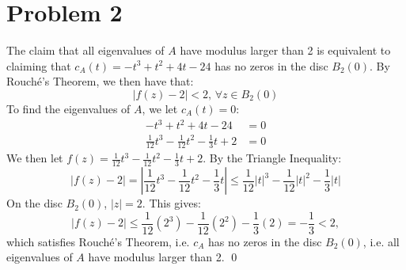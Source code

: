 \documentclass[a4paper, titlepage, DIV=14]{scrartcl}
\begin{document}
    \section*{Problem 2}
    The claim that all eigenvalues of $A$ have modulus larger than 2 is equivalent to claiming that
    $c_{A}(t) = -t^{3} + t^{2} + 4t -24$ has no zeros in the disc $B_{2}(0)$. By Rouch\'{e}'s Theorem, 
    we then have that:
    \begin{equation*}
        |f(z) - 2| < 2, \, \forall z \in B_{2}(0)
    \end{equation*}
    To find the eigenvalues of $A$, we let $c_{A}(t) = 0$:
    \begin{align*}
        -t^{3} + t^{2} + 4t - 24 &= 0 \\
        \frac{1}{12}t^{3} - \frac{1}{12}t^{2} - \frac{1}{3}t + 2 &= 0
    \end{align*}
    We then let $f(z)=\frac{1}{12}t^{3} - \frac{1}{12}t^{2} - \frac{1}{3}t + 2$. By the Triangle Inequality:
    \begin{equation*}
        |f(z)-2| = |\frac{1}{12}t^{3} - \frac{1}{12}t^{2} - \frac{1}{3}t| \leq \frac{1}{12}|t|^{3} - \frac{1}{12}|t|^{2} - \frac{1}{3}|t| 
    \end{equation*}
    On the disc $B_{2}(0)$, $|z|=2$. This gives:
    \begin{equation*}
        |f(z) - 2| \leq \frac{1}{12}(2^{3}) - \frac{1}{12}(2^{2}) - \frac{1}{3}(2) = -\frac{1}{3} < 2,
    \end{equation*}
    which satisfies Rouch\'{e}'s Theorem, i.e. $c_{A}$ has no zeros in the disc $B_{2}(0)$, i.e. all eigenvalues
    of $A$ have modulus larger than 2. \qed
    
\end{document}
